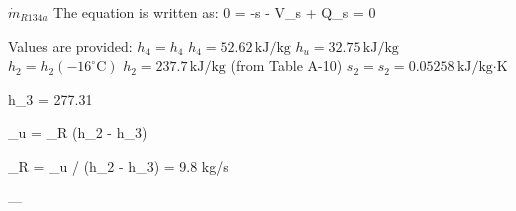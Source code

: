 \( \dot{m}_{R134a} \)  
The equation is written as:  
0 = -s  - V_s + Q_s = 0  

Values are provided:  
\( h_4 = h_4 \)  
\( h_4 = 52.62 \, \text{kJ/kg} \)  
\( h_u = 32.75 \, \text{kJ/kg} \)  
\( h_2 = h_2 (-16^\circ \text{C}) \)  
\( h_2 = 237.7 \, \text{kJ/kg} \) (from Table A-10)  
\( s_2 = s_2 = 0.05258 \, \text{kJ/kg·K} \)

h_3 = 277.31  

_u = _R (h_2 - h_3)  

_R = _u / (h_2 - h_3) = 9.8 kg/s  

---